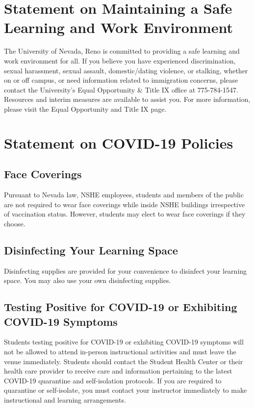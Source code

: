 \documentclass[11pt, a4paper]{article}
\begin{document}
\section*{Statement on Maintaining a Safe Learning and Work Environment}
The University of Nevada, Reno is committed to providing a safe learning and work environment for all. If you believe you have experienced discrimination, sexual harassment, sexual assault, domestic/dating violence, or stalking, whether on or off campus, or need information related to immigration concerns, please contact the University’s Equal Opportunity \& Title IX office at 775-784-1547. Resources and interim measures are available to assist you. For more information, please visit the Equal Opportunity and Title IX page.

\section*{Statement on COVID-19 Policies}
\subsection*{Face Coverings}
Pursuant to Nevada law, NSHE employees, students and members of the public are not required to wear face coverings while inside NSHE buildings irrespective of vaccination status. However, students may elect to wear face coverings if they choose.

\subsection*{Disinfecting Your Learning Space}
Disinfecting supplies are provided for your convenience to disinfect your learning space. You may also use your own disinfecting supplies.

\subsection*{Testing Positive for COVID-19 or Exhibiting COVID-19 Symptoms}
Students testing positive for COVID-19 or exhibiting COVID-19 symptoms will not be allowed to attend in-person instructional activities and must leave the venue immediately. Students should contact the Student Health Center or their health care provider to receive care and information pertaining to the latest COVID-19 quarantine and self-isolation protocols. If you are required to quarantine or self-isolate, you must contact your instructor immediately to make instructional and learning arrangements.
\end{document}
